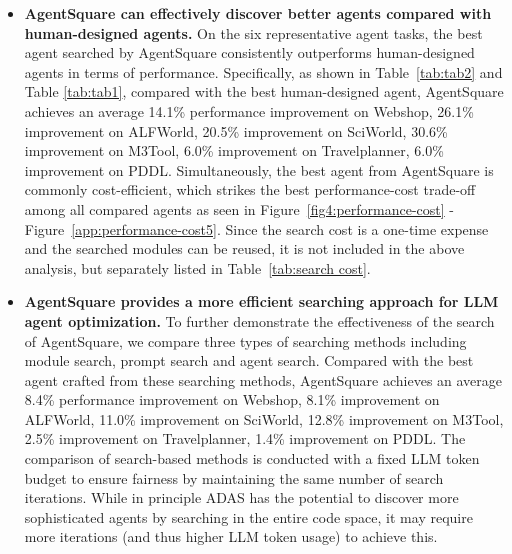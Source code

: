 \begin{itemize}[leftmargin=*]
    \item \textbf{AgentSquare can effectively discover better agents compared with human-designed agents.} 
    On the six representative agent tasks, the best agent searched by AgentSquare consistently outperforms human-designed agents in terms of performance.
    Specifically, as shown in Table~\ref{tab:tab2} and Table \ref{tab:tab1}, compared with the best human-designed agent, AgentSquare achieves an average 14.1\% performance improvement on Webshop, 26.1\% improvement on ALFWorld, 20.5\% improvement on SciWorld, 30.6\% improvement on M3Tool, 6.0\% improvement on Travelplanner, 6.0\% improvement on PDDL. 
    Simultaneously, the best agent from AgentSquare is commonly cost-efficient, which strikes the best performance-cost trade-off among all compared agents as seen in Figure~\ref{fig4:performance-cost} -Figure~\ref{app:performance-cost5}.
    Since the search cost is a one-time expense and the searched modules can be reused, it is not included in the above analysis, but separately listed in Table~\ref{tab:search cost}.
    \item \textbf{AgentSquare provides a more efficient searching approach for LLM agent optimization.}
    To further demonstrate the effectiveness of the search of AgentSquare, we compare three types of searching methods including module search, prompt search and agent search. 
    Compared with the best agent crafted from these searching methods, AgentSquare achieves an average 8.4\% performance improvement on Webshop, 8.1\% improvement on ALFWorld, 11.0\% improvement on SciWorld, 12.8\% improvement on M3Tool, 2.5\% improvement on Travelplanner, 1.4\% improvement on PDDL.
    The comparison of search-based methods is conducted with a fixed LLM token budget to ensure fairness by maintaining the same number of search iterations.
    While in principle ADAS has the potential to discover more sophisticated agents by searching in the entire code space, it may require more iterations (and thus higher LLM token usage) to achieve this.
\end{itemize}
